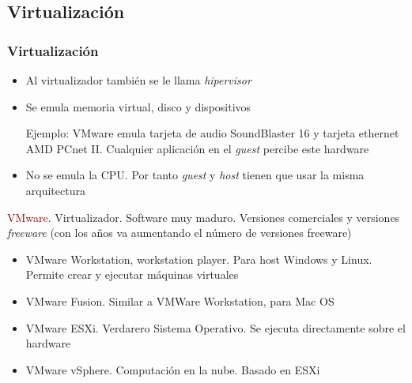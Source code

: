 \documentclass[ucs]{beamer}
\newcommand{\res}[1]{\textcolor{darkred}{#1}}
\begin{document}
\subsection{Virtualización}
\begin{frame}[fragile]

\frametitle{Virtualización}
\begin{itemize}
\item
Al virtualizador también se le llama \emph{hipervisor}

\item
Se emula memoria virtual, disco y dispositivos

Ejemplo: VMware emula tarjeta de audio SoundBlaster 16 y
tarjeta ethernet
AMD PCnet II. Cualquier aplicación en el \emph{guest}
percibe este hardware


\item
No se emula la CPU.
Por tanto 
\emph{guest} y \emph{host} 
tienen que usar la misma arquitectura
\end{itemize}


\end{frame}



\begin{frame}[fragile]

\res{VMware}. Virtualizador. Software muy maduro. Versiones comerciales y versiones \emph{freeware} 
(con los años va aumentando el número de versiones freeware)
\begin{itemize}
\item
VMware Workstation, workstation player. Para host Windows y Linux. Permite crear y ejecutar máquinas virtuales 
\item
VMware Fusion. Similar a VMWare Workstation, para Mac OS
\item
VMware ESXi. Verdarero Sistema Operativo. Se ejecuta directamente sobre el hardware
\item
VMware vSphere. Computación en la nube. Basado en ESXi
\end{itemize}


\end{frame}
\end{document}
